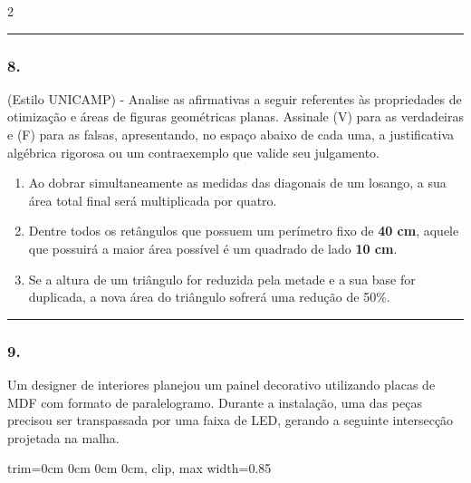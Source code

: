 \documentclass[twoside, 10pt, a4paper]{article}
\newlength{\espacoPreQuestao}\setlength{\espacoPreQuestao}{0.1cm}
\newlength{\espacoQuestao}\setlength{\espacoQuestao}{0.2cm}
\newlength{\espacoAlt}\setlength{\espacoAlt}{0.2cm}
\newcommand{\larguraTikz}{0.85\linewidth}
\begin{document}
\begin{multicols*}{2}
\noindent\textcolor{CorLinha}{\rule{\linewidth}{0.5pt}} 
\par\vspace{\espacoPreQuestao}
\subsubsection*{8.} (Estilo UNICAMP) - Analise as afirmativas a seguir referentes às propriedades de otimização e áreas de figuras geométricas planas. Assinale (V) para as verdadeiras e (F) para as falsas, apresentando, no espaço abaixo de cada uma, a justificativa algébrica rigorosa ou um contraexemplo que valide seu julgamento.
\begin{enumerate}[label=\Roman*., itemsep=\espacoAlt]
\item Ao dobrar simultaneamente as medidas das diagonais de um losango, a sua área total final será multiplicada por quatro.
\item Dentre todos os retângulos que possuem um perímetro fixo de \textbf{40 cm}, aquele que possuirá a maior área possível é um quadrado de lado \textbf{10 cm}.
\item Se a altura de um triângulo for reduzida pela metade e a sua base for duplicada, a nova área do triângulo sofrerá uma redução de 50\%.
\end{enumerate}
\par\vspace{\espacoQuestao}

\noindent\textcolor{CorLinha}{\rule{\linewidth}{0.5pt}} 
\par\vspace{\espacoPreQuestao}
\subsubsection*{9.} Um designer de interiores planejou um painel decorativo utilizando placas de MDF com formato de paralelogramo. Durante a instalação, uma das peças precisou ser transpassada por uma faixa de LED, gerando a seguinte intersecção projetada na malha.
\begin{center}
\begin{adjustbox}{trim=0cm 0cm 0cm 0cm, clip, max width=\larguraTikz}
\end{adjustbox}
\end{center}
\end{multicols*}
\end{document}
